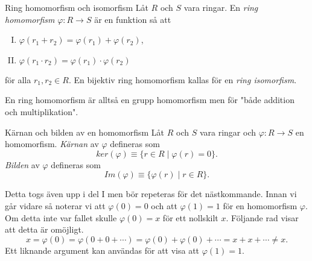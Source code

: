 \documentclass{article}
\theoremstyle{definition}
\begin{document}
\begin{mydef}{Ring homomorfism och isomorfism}{}
  Låt $R$ och $S$ vara ringar. En \textit{ring homomorfism} $\varphi: R \rightarrow S$ är en funktion så att 
  \begin{enumerate}[I)]
    \item $\varphi(r_1 + r_2) = \varphi(r_1) + \varphi(r_2)$,
    \item $\varphi(r_1 \cdot r_2) = \varphi(r_1) \cdot \varphi(r_2)$
  \end{enumerate}
  för alla $r_1, r_2 \in R$. En bijektiv ring homomorfism kallas för en \textit{ring isomorfism}.
\end{mydef}
En ring homomorfism är alltså en grupp homomorfism men för "både addition och multiplikation".

\begin{mydef}{Kärnan och bilden av en homomorfism}{}
  Låt $R$ och $S$ vara ringar och $\varphi: R \rightarrow S$ en homomorfism. \textit{Kärnan} av $\varphi$
  defineras som 
  \[ker(\varphi) \equiv \{r \in R \; | \; \varphi(r) = 0\}.\]
  \textit{Bilden} av $\varphi$ defineras som 
  \[Im(\varphi) \equiv \{\varphi(r) \; | \; r \in R\}.\]
\end{mydef}
Detta togs även upp i del I men bör repeteras för det nästkommande. Innan vi går vidare 
så noterar vi att $\varphi(0) = 0$ och att $\varphi(1) = 1$ för en homomorfism $\varphi$. Om detta inte var fallet skulle $\varphi(0) = x$ för ett nollskilt $x$. 
Följande rad visar att detta är omöjligt.
\[x = \varphi(0) = \varphi(0 + 0 + \cdots) = \varphi(0) + \varphi(0) + \cdots =  x + x + \cdots \neq x.\]
Ett liknande argument kan användas för att visa att $\varphi(1) = 1$.
\end{document}
